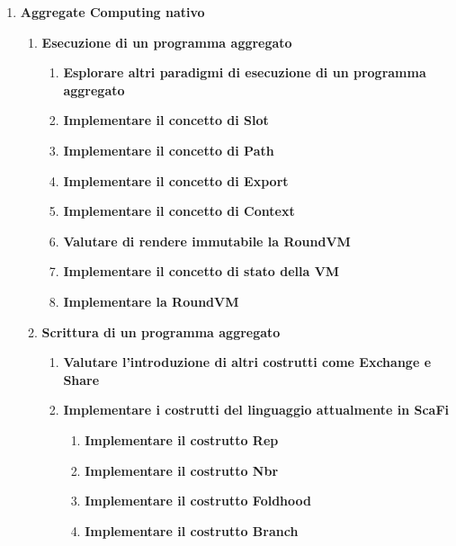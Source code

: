 \documentclass[12pt, a4paper]{article}
\begin{document}
\begin{enumerate}
    \color{teal}
    \item \textbf{Aggregate Computing nativo}
          \begin{enumerate}
              \item \textbf{Esecuzione di un programma aggregato}
                    \begin{enumerate}
                        \item \textbf{Esplorare altri paradigmi di esecuzione di un programma aggregato}
                        \item \textbf{Implementare il concetto di Slot}
                        \item \textbf{Implementare il concetto di Path}
                        \item \textbf{Implementare il concetto di Export}
                        \item \textbf{Implementare il concetto di Context}
                        \item \textbf{Valutare di rendere immutabile la RoundVM}
                        \item \textbf{Implementare il concetto di stato della VM}
                        \item \textbf{Implementare la RoundVM}
                    \end{enumerate}

              \item \textbf{Scrittura di un programma aggregato}
                    \begin{enumerate}
                        \item \textbf{Valutare l'introduzione di altri costrutti come Exchange e Share}
                        \item \textbf{Implementare i costrutti del linguaggio attualmente in ScaFi}
                              \begin{enumerate}
                                  \item \textbf{Implementare il costrutto Rep}
                                  \item \textbf{Implementare il costrutto Nbr}
                                  \item \textbf{Implementare il costrutto Foldhood}
                                  \item \textbf{Implementare il costrutto Branch}
                              \end{enumerate}
                    \end{enumerate}



\end{enumerate}
\end{enumerate}
\end{document}
